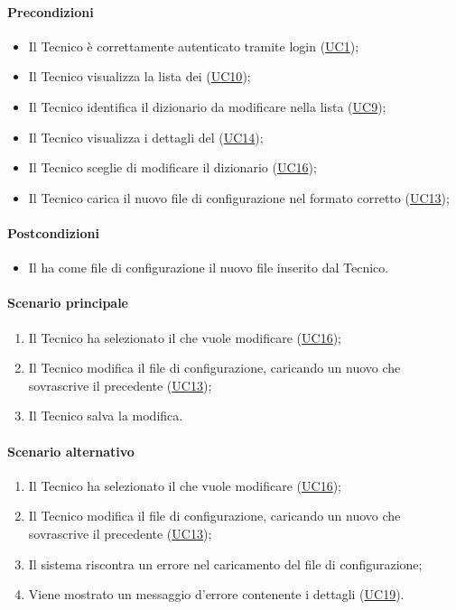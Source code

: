 \paragraph*{Precondizioni}
\begin{itemize}
  \item Il Tecnico è correttamente autenticato tramite login (\hyperref[UC1]{UC1});
  \item Il Tecnico visualizza la lista dei  (\hyperref[UC10]{UC10});
  \item Il Tecnico identifica il dizionario da modificare nella lista (\hyperref[UC9]{UC9});
  \item Il Tecnico visualizza i dettagli del  (\hyperref[UC14]{UC14});
  \item Il Tecnico sceglie di modificare il dizionario (\hyperref[UC16]{UC16});
  \item Il Tecnico carica il nuovo file di configurazione nel formato corretto (\hyperref[UC13]{UC13});
\end{itemize}

\paragraph*{Postcondizioni}
\begin{itemize}
  \item Il  ha come file di configurazione il nuovo file inserito dal Tecnico.
\end{itemize}

\paragraph*{Scenario principale}
\begin{enumerate}
  \item Il Tecnico ha selezionato il  che vuole modificare (\hyperref[UC16]{UC16});
  \item Il Tecnico modifica il file di configurazione, caricando un nuovo  che sovrascrive il precedente (\hyperref[UC13]{UC13});
  \item Il Tecnico salva la modifica.
\end{enumerate}

\paragraph*{Scenario alternativo}
\begin{enumerate}
  \item Il Tecnico ha selezionato il  che vuole modificare (\hyperref[UC16]{UC16});
  \item Il Tecnico modifica il file di configurazione, caricando un nuovo  che sovrascrive il precedente (\hyperref[UC13]{UC13});
  \item Il sistema riscontra un errore nel caricamento del file di configurazione;
  \item Viene mostrato un messaggio d'errore contenente i dettagli (\hyperref[UC19]{UC19}).
\end{enumerate}

